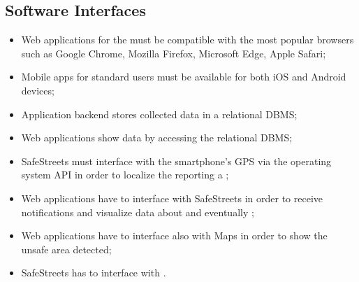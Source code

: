\documentclass[../../../RASD.tex]{subfiles}
\begin{document}
\subsection{Software Interfaces\label{sect:3.1.3}}
\begin{itemize}
	\item Web applications for the  must be compatible with the most popular browsers such as Google Chrome, Mozilla Firefox, Microsoft Edge, Apple Safari; 
	\item Mobile apps for standard users must be available for both iOS and Android devices;
	\item Application backend stores collected data in a relational DBMS; 
	\item Web applications show data by accessing the relational DBMS; 
	\item SafeStreets must interface with the smartphone's GPS via the operating system API in order to localize the  reporting a ;
	\item Web applications have to interface with SafeStreets in order to receive notifications and visualize data about  and eventually ;
	\item Web applications have to interface also with Maps in order to show the unsafe area detected; 
	\item SafeStreets has to interface with .
	 
\end{itemize}
\end{document}
